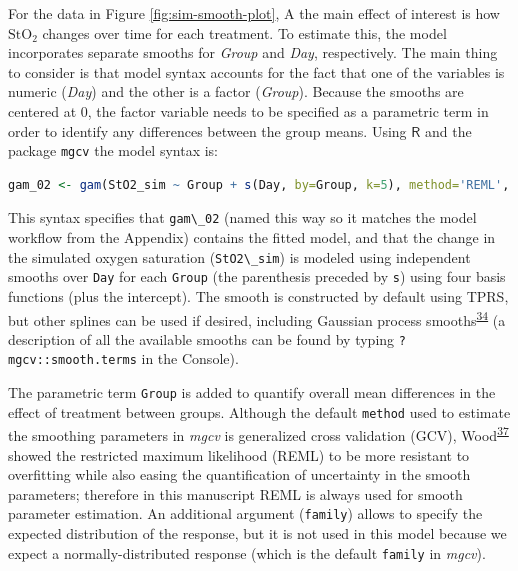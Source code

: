 \documentclass[
]{article}
\newcommand{\passthrough}[1]{#1}
\begin{document}
For the data in Figure \ref{fig:sim-smooth-plot}, A the main effect of interest is how \(\mbox{StO}_2\) changes over time for each treatment. To estimate this, the model incorporates separate smooths for \emph{Group} and \emph{Day}, respectively. The main thing to consider is that model syntax accounts for the fact that one of the variables is numeric (\emph{Day}) and the other is a factor (\emph{Group}). Because the smooths are centered at 0, the factor variable needs to be specified as a parametric term in order to identify any differences between the group means. Using \(\textsf{R}\) and the package \passthrough{\lstinline!mgcv!} the model syntax is:

\begin{lstlisting}[language=R]
gam_02 <- gam(StO2_sim ~ Group + s(Day, by=Group, k=5), method='REML', data = dat_sim)
\end{lstlisting}

This syntax specifies that \passthrough{\lstinline!gam\_02!} (named this way so it matches the model workflow from the Appendix) contains the fitted model, and that the change in the simulated oxygen saturation (\passthrough{\lstinline!StO2\_sim!}) is modeled using independent smooths over \passthrough{\lstinline!Day!} for each \passthrough{\lstinline!Group!} (the parenthesis preceded by \passthrough{\lstinline!s!}) using four basis functions (plus the intercept). The smooth is constructed by default using TPRS, but other splines can be used if desired, including Gaussian process smooths\textsuperscript{\protect\hyperlink{ref-simpson2018}{34}} (a description of all the available smooths can be found by typing \passthrough{\lstinline!?mgcv::smooth.terms!} in the Console).

The parametric term \passthrough{\lstinline!Group!} is added to quantify overall mean differences in the effect of treatment between groups. Although the default \passthrough{\lstinline!method!} used to estimate the smoothing parameters in \emph{mgcv} is generalized cross validation (GCV), Wood\textsuperscript{\protect\hyperlink{ref-wood2017}{37}} showed the restricted maximum likelihood (REML) to be more resistant to overfitting while also easing the quantification of uncertainty in the smooth parameters; therefore in this manuscript REML is always used for smooth parameter estimation. An additional argument (\passthrough{\lstinline!family!}) allows to specify the expected distribution of the response, but it is not used in this model because we expect a normally-distributed response (which is the default \passthrough{\lstinline!family!} in \emph{mgcv}).
\end{document}
